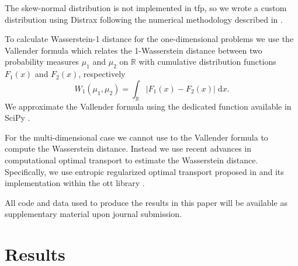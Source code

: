 \documentclass[12pt]{article}
\begin{document}
The skew-normal distribution is not implemented in \gls{tfp}, so we wrote a
custom distribution using Distrax \citep{deepmind2020jax} following the
numerical methodology described in \citep{ghorbanzadeh_method_2014}. 

To calculate Wasserstein-1 distance for the one-dimensional problems we use the
Vallender formula \cite{vallender_calculation_1974} which relates the
1-Wasserstein distance between two probability measures $\mu_1$ and $\mu_2$ on
$\mathbb{R}$ with cumulative distribution functions $F_1(x)$ and $F_2(x)$,
respectively
\begin{equation}
W_1(\mu_1, \mu_2) = \int_{\mathbb{R}} | F_1(x) - F_2(x) | \; \mathrm{d}x.
\end{equation}
We approximate the Vallender formula using the dedicated function available in
SciPy \citep{2020SciPy-NMeth}. 

For the multi-dimensional case we cannot use to the Vallender formula to
compute the Wasserstein distance. Instead we use recent advances in
computational optimal transport to estimate the Wasserstein distance.
Specifically, we use entropic regularized optimal transport proposed in
\citep{NIPS2013_af21d0c9} and its implementation within the \gls{ott} library
\citep{cuturi2022optimal}. 


All code and data used to produce the results in this paper will be available
as supplementary material upon journal submission.

\section{Results}
\end{document}
